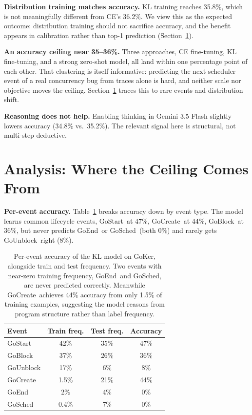 \documentclass{svproc}
\newcommand{\pblock}{\textsf{GoBlock}}
\newcommand{\punblock}{\textsf{GoUnblock}}
\newcommand{\pstart}{\textsf{GoStart}}
\newcommand{\pcreate}{\textsf{GoCreate}}
\newcommand{\pend}{\textsf{GoEnd}}
\newcommand{\psched}{\textsf{GoSched}}
\begin{document}
\textbf{Distribution training matches accuracy.}
KL training reaches 35.8\%, which is not meaningfully different from
CE's 36.2\%. We view this as the expected outcome: distribution training
should not sacrifice accuracy, and the benefit appears in calibration
rather than top-1 prediction (Section~\ref{sec:analysis}).

\textbf{An accuracy ceiling near 35--36\%.}
Three approaches, CE fine-tuning, KL fine-tuning, and a strong zero-shot
model, all land within one percentage point of each other. That
clustering is itself informative: predicting the next scheduler event of
a real concurrency bug from traces alone is hard, and neither scale nor
objective moves the ceiling. Section~\ref{sec:analysis} traces this to
rare events and distribution shift.

\textbf{Reasoning does not help.}
Enabling thinking in Gemini 3.5 Flash slightly lowers accuracy
(34.8\% vs.\ 35.2\%). The relevant signal here is structural, not
multi-step deductive.

\section{Analysis: Where the Ceiling Comes From}\label{sec:analysis}

\textbf{Per-event accuracy.}
Table~\ref{tab:perevent} breaks accuracy down by event type. The model
learns common lifecycle events, \pstart\ at 47\%, \pcreate\ at 44\%,
\pblock\ at 36\%, but never predicts \pend\ or \psched\ (both 0\%) and
rarely gets \punblock\ right (8\%).

\begin{table}[t]
\centering
\caption{Per-event accuracy of the KL model on GoKer, alongside train
and test frequency. Two events with near-zero training frequency,
\pend\ and \psched, are never predicted correctly. Meanwhile \pcreate\
achieves 44\% accuracy from only 1.5\% of training examples, suggesting
the model reasons from program structure rather than label frequency.}
\label{tab:perevent}
\small
\begin{tabular}{lccc}
\toprule
\textbf{Event} & \textbf{Train freq.} & \textbf{Test freq.} & \textbf{Accuracy}\\
\midrule
\pstart   & 42\%  & 35\% & 47\%\\
\pblock   & 37\%  & 26\% & 36\%\\
\punblock & 17\%  & 6\%  & 8\%\\
\pcreate  & 1.5\% & 21\% & 44\%\\
\pend     & 2\%   & 4\%  & 0\%\\
\psched   & 0.4\% & 7\%  & 0\%\\
\bottomrule
\end{tabular}
\end{table}
\end{document}
